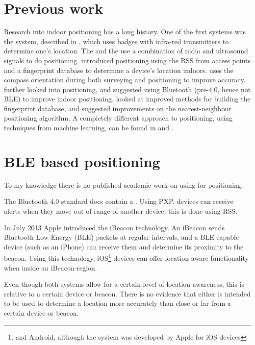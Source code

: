 \section{Previous work}
Research into indoor positioning has a long history.
One of the first systems was the  system, described in \citet{want1992active}, which uses badges with infra-red transmitters to determine one's location.
The  \citep{harter2002anatomy} and the  \citep{priyantha2000cricket} use a combination of radio and ultrasound signals to do positioning.
\citet{bahl2000radar} introduced \wifi positioning using the RSS from \wifi access points and a fingerprint database to determine a device's location indoors.
\citet{king2006compass} uses the compass orientation during both surveying and positioning to improve accuracy.
\citet{castro2001probabilistic} further looked into \wifi positioning, and \citet{pandya2003indoor} suggested using Bluetooth (pre-4.0, hence not BLE) to improve indoor positioning.
\citet{li2005method} looked at improved methods for building the fingerprint database, and \citet{shin2012enhanced} suggested improvements on the nearest-neighbour positioning algorithm.
A completely different approach to positioning, using techniques from machine learning, can be found in \citet{battiti2002location} and \citep{ferris2007wifi}.


\section{BLE based positioning}
To my knowledge there is no published academic work on using \BLE for positioning.

The Bluetooth 4.0 standard does contain a .
Using PXP, devices can receive alerts when they move out of range of another device; this is done using RSS.

In July 2013 Apple introduced the iBeacon technology.
An iBeacon sends Bluetooth Low Energy (BLE) packets at regular intervals, and a BLE capable device (such as an iPhone) can receive them and determine its proximity to the beacon.
Using this technology, iOS\footnote{and Android, although the system was developed by Apple for iOS devices} devices can offer location-aware functionality when inside an iBeacon-region.

Even though both systems allow for a certain level of location awareness, this is relative to a certain device or beacon.
There is no evidence that either is intended to be used to determine a location more accurately than close or far from a certain device or beacon.

